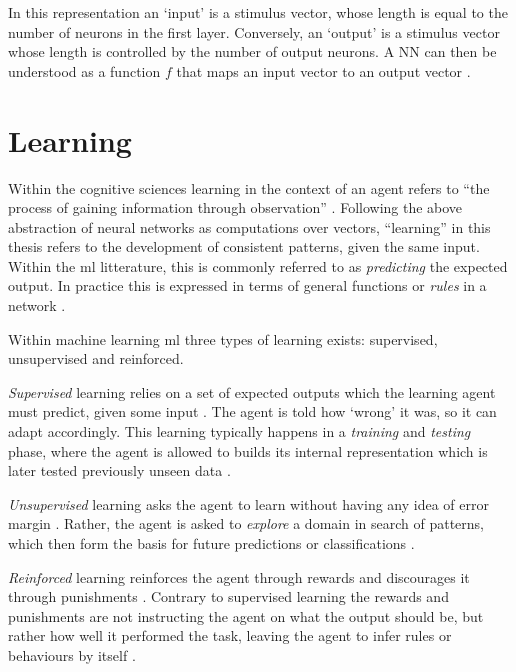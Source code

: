 \documentclass[report.tex]{subfiles}
\begin{document}
In this representation an `input' is a stimulus vector, whose
length is equal to the number of neurons in the first layer.
Conversely, an `output' is a stimulus vector whose length
is controlled by the number of output neurons.
A \gls{NN} can then be understood as a function $f$ that 
maps an input vector to an output vector \cite{Russel2007}.

\section{Learning} 
Within the cognitive sciences learning in the context of an  \gls{agent}
refers to ``the process of gaining
information through observation'' \cite{sep:learning-formal}.
Following the above abstraction of neural networks as computations over vectors,
``learning'' in this thesis 
refers to the development of consistent patterns, given the same input.
Within the \gls{ml} litterature, this is commonly referred to as 
\textit{predicting}  the expected output.
In practice this is expressed in terms of general functions or
\textit{rules}  in a network \cite[p. 704.]{Russel2007}.

Within machine learning \gls{ml} three types of
learning exists: supervised, 
unsupervised  and reinforced.

\textit{Supervised} learning relies on a set of expected outputs which 
the learning \gls{agent} must predict, given some input \cite{Russel2007}.
The \gls{agent} is told how `wrong' it was, so it can adapt accordingly.
This learning typically happens in a \textit{training} and \textit{testing}
phase, where the \gls{agent} is allowed to builds its internal representation
which is later tested previously unseen data \cite{Russel2007}.

\textit{Unsupervised} learning asks the \gls{agent} to learn without
having any idea of error margin \cite{Russel2007}.
Rather, the \gls{agent} is asked to \textit{explore} a domain in search of
patterns, which then form the basis for future predictions or classifications
\cite{Russel2007}.

\textit{Reinforced} learning reinforces the \gls{agent} through
rewards and discourages it through punishments \cite{Russel2007}.
Contrary to supervised learning the rewards and punishments are not
instructing the agent on what the output should be, but rather how well
it performed the task, leaving the \gls{agent} to infer rules or
behaviours by itself \cite[p. 873]{Russel2007}.
\end{document}
